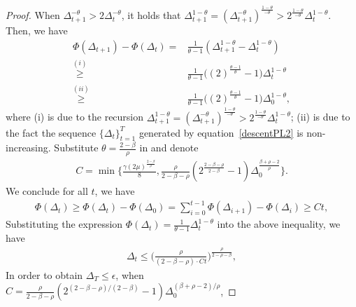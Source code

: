 \documentclass[10pt]{article} %
\def\eqref#1{equation~\ref{#1}}
\newtheorem{proof}{Proof}
\begin{document}
\begin{proof}
When $\Delta_{t+1}^{-\theta}> 2 \Delta_t^{-\theta}$, it holds that $\Delta_{t+1}^{1-\theta}=(\Delta_{t+1}^{-\theta})^{\frac{1-\theta}{-\theta}} > 2^{\frac{1-\theta}{-\theta}}\Delta_t^{1-\theta} $.
Then, we have
\begin{align}
    \Phi(\Delta_{t+1})-\Phi(\Delta_t)=&\frac{1}{\theta-1}(\Delta_{t+1}^{1-\theta}-\Delta_t^{1-\theta}) \nonumber\\
    \overset{(i)}{\geq}& \frac{1}{\theta-1}\big((2)^{\frac{\theta-1}{\theta}}-1\big)\Delta_t^{1-\theta} \nonumber\\
    \overset{(ii)}{\geq}& \frac{1}{\theta-1}\big((2)^{\frac{\theta-1}{\theta}}-1\big)\Delta_0^{1-\theta},\nonumber
\end{align}
where (i) is due to the recursion $\Delta_{t+1}^{1-\theta}=(\Delta_{t+1}^{-\theta})^{\frac{1-\theta}{-\theta}} > 2^{\frac{1-\theta}{-\theta}}\Delta_t^{1-\theta} $; (ii) is due to the fact the sequence $\{\Delta_t\}_{t=1}^{T}$ generated by \eqref{descentPL2} is non-increasing. 
Substitute $\theta=\frac{2-\beta}{\rho}$ in and denote 
\begin{align}
    C=\min\Big\{\frac{\gamma(2\mu)^{\frac{2-\beta}{\rho}}}{8},\frac{\rho}{2-\beta-\rho}(2^{\frac{2-\beta-\rho}{2-\beta}}-1)\Delta_0^{\frac{\beta+\rho-2}{\rho}}  \Big\}. \nonumber
\end{align}
We conclude for all $t$, we have
\begin{align}
    \Phi(\Delta_t)\geq \Phi(\Delta_t)-\Phi(\Delta_0)= \sum_{i=0}^{t-1}\Phi(\Delta_{i+1})-\Phi(\Delta_{i})\geq C t, \nonumber
\end{align}
Substituting the expression $\Phi(\Delta_t)=\frac{1}{\theta-1}\Delta_t^{1-\theta}$ into the above inequality, we have
\begin{align}
    \Delta_{t}\leq \Big(\frac{\rho}{(2-\beta-\rho)\cdot Ct}\Big)^{\frac{\rho}{2-\rho-\beta}},
\end{align}
In order to obtain $\Delta_T\leq \epsilon$,
when $C=\frac{\rho}{2-\beta-\rho}(2^{{(2-\beta-\rho)}/{(2-\beta)}}-1)\Delta_0^{{(\beta+\rho-2)}/{\rho}}$, %

\end{proof}
\end{document}
